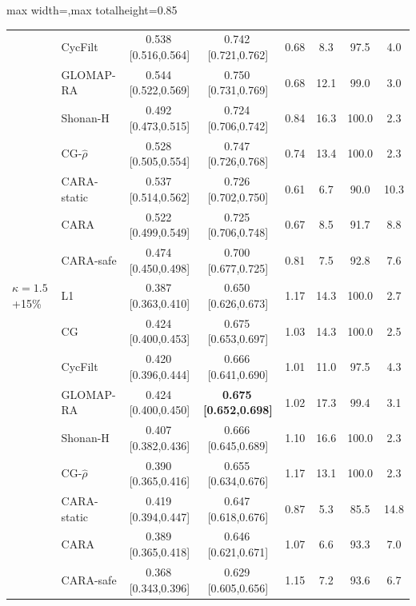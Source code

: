\begin{table}[!htbp]
\begin{adjustbox}{max width=\textwidth,max totalheight=0.85\textheight}
\begin{tabular}{llcccccc}
 & CycFilt & 0.538\,{\scriptsize[0.516,0.564]} & 0.742\,{\scriptsize[0.721,0.762]} & 0.68 & 8.3 & 97.5 & 4.0\\
 & GLOMAP-RA & 0.544\,{\scriptsize[0.522,0.569]} & 0.750\,{\scriptsize[0.731,0.769]} & 0.68 & 12.1 & 99.0 & 3.0\\
 & Shonan-H & 0.492\,{\scriptsize[0.473,0.515]} & 0.724\,{\scriptsize[0.706,0.742]} & 0.84 & 16.3 & 100.0 & 2.3\\
 & CG-$\hat\rho$ & 0.528\,{\scriptsize[0.505,0.554]} & 0.747\,{\scriptsize[0.726,0.768]} & 0.74 & 13.4 & 100.0 & 2.3\\
 & CARA-static & 0.537\,{\scriptsize[0.514,0.562]} & 0.726\,{\scriptsize[0.702,0.750]} & 0.61 & 6.7 & 90.0 & 10.3\\
 & CARA & 0.522\,{\scriptsize[0.499,0.549]} & 0.725\,{\scriptsize[0.706,0.748]} & 0.67 & 8.5 & 91.7 & 8.8\\
 & CARA-safe & 0.474\,{\scriptsize[0.450,0.498]} & 0.700\,{\scriptsize[0.677,0.725]} & 0.81 & 7.5 & 92.8 & 7.6\\
\midrule
$\kappa{=}1.5$+15\% & L1 & 0.387\,{\scriptsize[0.363,0.410]} & 0.650\,{\scriptsize[0.626,0.673]} & 1.17 & 14.3 & 100.0 & 2.7\\
 & CG & 0.424\,{\scriptsize[0.400,0.453]} & 0.675\,{\scriptsize[0.653,0.697]} & 1.03 & 14.3 & 100.0 & 2.5\\
 & CycFilt & 0.420\,{\scriptsize[0.396,0.444]} & 0.666\,{\scriptsize[0.641,0.690]} & 1.01 & 11.0 & 97.5 & 4.3\\
 & GLOMAP-RA & 0.424\,{\scriptsize[0.400,0.450]} & \textbf{0.675\,{\scriptsize[0.652,0.698]}} & 1.02 & 17.3 & 99.4 & 3.1\\
 & Shonan-H & 0.407\,{\scriptsize[0.382,0.436]} & 0.666\,{\scriptsize[0.645,0.689]} & 1.10 & 16.6 & 100.0 & 2.3\\
 & CG-$\hat\rho$ & 0.390\,{\scriptsize[0.365,0.416]} & 0.655\,{\scriptsize[0.634,0.676]} & 1.17 & 13.1 & 100.0 & 2.3\\
 & CARA-static & 0.419\,{\scriptsize[0.394,0.447]} & 0.647\,{\scriptsize[0.618,0.676]} & 0.87 & 5.3 & 85.5 & 14.8\\
 & CARA & 0.389\,{\scriptsize[0.365,0.418]} & 0.646\,{\scriptsize[0.621,0.671]} & 1.07 & 6.6 & 93.3 & 7.0\\
 & CARA-safe & 0.368\,{\scriptsize[0.343,0.396]} & 0.629\,{\scriptsize[0.605,0.656]} & 1.15 & 7.2 & 93.6 & 6.7\\
\bottomrule
\end{tabular}\end{adjustbox}
\end{table}
